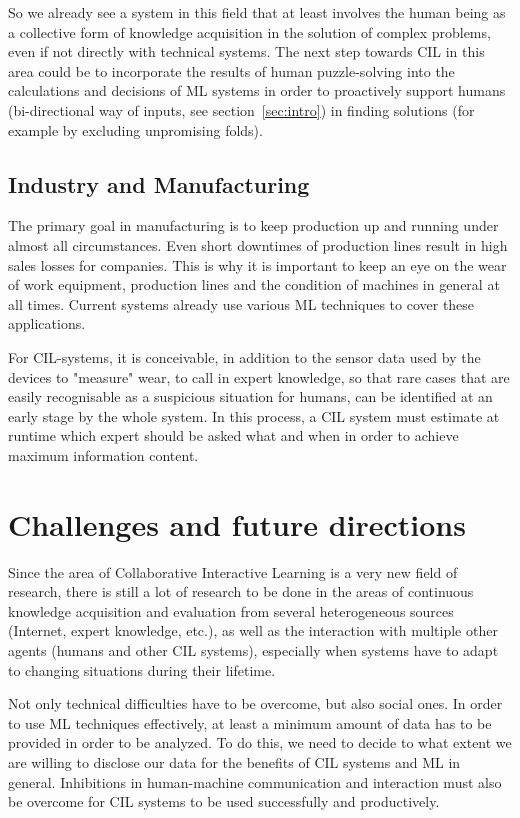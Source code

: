 \documentclass[conference]{IEEEtran}
\begin{document}
So we already see a system in this field that at least involves the human being as a collective form of knowledge acquisition in the solution of complex problems, even if not directly with technical systems.
The next step towards CIL in this area could be to incorporate the results of human puzzle-solving into the calculations and decisions of ML systems in order to proactively support humans (bi-directional way of inputs, see section~\ref{sec:intro}) in finding solutions (for example by excluding unpromising folds).


\subsection{Industry and Manufacturing}
The primary goal in manufacturing is to keep production up and running under almost all circumstances. 
Even short downtimes of production lines result in high sales losses for companies.
This is why it is important to keep an eye on the wear of work equipment, production lines and the condition of machines in general at all times.
Current systems already use various ML techniques\cite{Manu:wuest} to cover these applications.

For CIL-systems, it is conceivable, in addition to the sensor data used by the devices to "measure" wear, to call in expert knowledge, so that rare cases that are easily recognisable as a suspicious situation for humans, can be identified at an early stage by the whole system.
In this process, a CIL system must estimate at runtime which expert should be asked what and when in order 
to achieve maximum information content.

\section{Challenges and future directions}
Since the area of Collaborative Interactive Learning is a very new field of research, there is still a lot of 
research to be done in the areas of continuous knowledge acquisition 
and evaluation from several heterogeneous sources (Internet, expert knowledge, etc.), 
as well as the interaction with multiple other agents (humans and other CIL systems), 
especially when systems have to adapt to changing situations during their lifetime.

Not only technical difficulties have to be overcome, but also social ones. In order to use ML techniques effectively, 
at least a minimum amount of data has to be provided in order to be analyzed. To do this, we need to decide 
to what extent we are willing to disclose our data for the benefits of CIL systems and ML in general.
Inhibitions in human-machine communication and interaction must also be overcome for CIL systems to be used 
successfully and productively.
\end{document}

